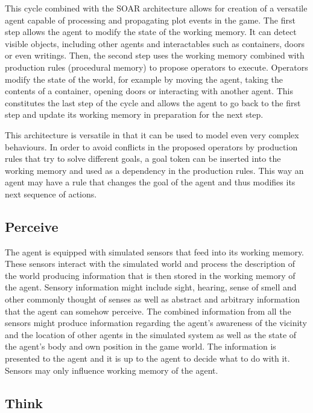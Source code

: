 This cycle combined with the SOAR architecture allows for creation of a versatile agent capable of processing and propagating plot events in the game.
The first step allows the agent to modify the state of the working memory.
It can detect visible objects, including other agents and interactables such as containers, doors or even writings.
Then, the second step uses the working memory combined with production rules (procedural memory) to propose operators to execute.
Operators modify the state of the world, for example by moving the agent, taking the contents of a container, opening doors or interacting with another agent.
This constitutes the last step of the cycle and allows the agent to go back to the first step and update its working memory in preparation for the next step.

This architecture is versatile in that it can be used to model even very complex behaviours.
In order to avoid conflicts in the proposed operators by production rules that try to solve different goals, a goal token can be inserted into the working memory and used as a dependency in the production rules.
This way an agent may have a rule that changes the goal of the agent and thus modifies its next sequence of actions.

\subsection{Perceive}

The agent is equipped with simulated sensors that feed into its working memory.
These sensors interact with the simulated world and process the description of the world producing information that is then stored in the working memory of the agent.
Sensory information might include sight, hearing, sense of smell and other commonly thought of senses as well as abstract and arbitrary information that the agent can somehow perceive.
The combined information from all the sensors might produce information regarding the agent's awareness of the vicinity and the location of other agents in the simulated system as well as the state of the agent's body and own position in the game world.
The information is presented to the agent and it is up to the agent to decide what to do with it.
Sensors may only influence working memory of the agent.

\subsection{Think}

